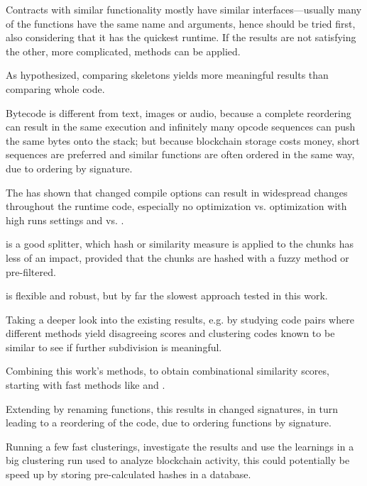 \documentclass[../main.tex]{subfiles}
\begin{document}
Contracts with similar functionality mostly have similar interfaces---usually many of the functions have the same name and arguments, hence  should be tried first, also considering that it has the quickest runtime. If the results are not satisfying the other, more complicated, methods can be applied.

As hypothesized, comparing skeletons yields more meaningful results than comparing whole code.

Bytecode is different from text, images or audio, because a complete reordering can result in the same execution and infinitely many opcode sequences can push the same bytes onto the stack; but because blockchain storage costs money, short sequences are preferred and similar functions are often ordered in the same way, due to  ordering by signature.

The \n{\solcts} has shown that changed compile options can result in widespread changes throughout the runtime code, especially no optimization vs. optimization with high runs settings and   vs. .

 is a good splitter, which hash or similarity measure is applied to the chunks has less of an impact, provided that the chunks are hashed with a fuzzy method or pre-filtered.

 is flexible and robust, but by far the slowest approach tested in this work.

Taking a deeper look into the existing results, e.g. by studying code pairs where different methods yield disagreeing scores and clustering codes known to be similar to see if further subdivision is meaningful.

Combining this work's methods, to obtain combinational similarity scores, starting with fast methods like  and .

Extending \n{\solcts} by renaming functions, this results in changed  signatures, in turn leading to a reordering of the code, due to  ordering functions by signature.

Running a few fast clusterings, investigate the results and use the learnings in a big clustering run used to analyze blockchain activity, this could potentially be speed up by storing pre-calculated hashes in a database.
\end{document}
